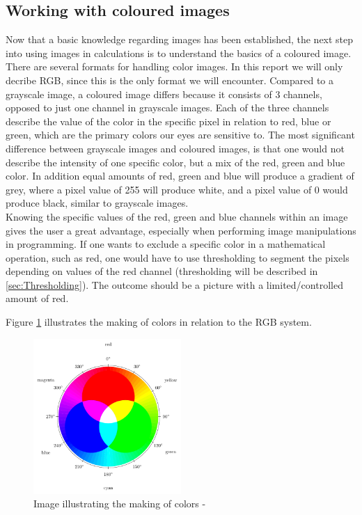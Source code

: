 \subsection{Working with coloured images}
Now that a basic knowledge regarding images has been established, the next step into using images in calculations is to understand the basics of a coloured image.\\
There are several formats for handling color images. In this report we will only decribe RGB, since this is the only format we will encounter. Compared to a grayscale image, a coloured image differs because it consists of 3 channels, opposed to just one channel in grayscale images. Each of the three channels describe the value of the color in the specific pixel in relation to red, blue or green, which are the primary colors our eyes are sensitive to. The most significant difference between grayscale images and coloured images, is that one would not describe the intensity of one specific color, but a mix of the red, green and blue color. In addition equal amounts of red, green and blue  will produce a gradient of grey, where a pixel value of 255 will produce white, and a pixel value of 0 would produce black, similar to grayscale images.\\
Knowing the specific values of the red, green and blue channels within an image gives the user a great advantage, especially when performing image manipulations in programming. If one wants to exclude a specific color in a mathematical operation, such as red, one would have to use thresholding to segment the pixels depending on values of the red channel (thresholding will be described in \ref{sec:Thresholding}). The outcome should be a picture with a limited/controlled amount of red. 

Figure \ref{fig:ip_ColorWheel} illustrates the making of colors in relation to the RGB system.

\begin{figure}[htbp]
\centering
\includegraphics[width=0.50\textwidth]{Pictures/Theory/RGBColor.pdf}
\caption{Image illustrating the making of colors - \citep{colorMixing}}
\label{fig:ip_ColorWheel}
\end{figure} 


